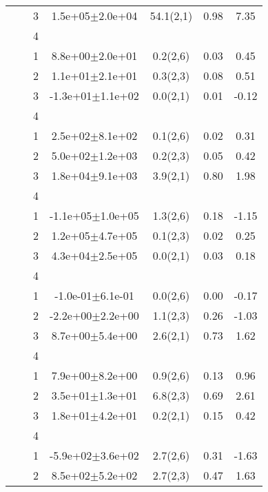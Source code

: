 \begin{longtable}{llccccS[table-format=-2.2, table-space-text-post = {***}]}
   &  & 3 &  1.5e+05$\pm$2.0e+04 & 54.1(2,1) & 0.98 & 7.35 \\ 
   &  & 4 &  &  &  &  \\ 
   \midrule
{} & {} & 1 &  8.8e+00$\pm$2.0e+01 & 0.2(2,6) & 0.03 & 0.45 \\ 
   &  & 2 &  1.1e+01$\pm$2.1e+01 & 0.3(2,3) & 0.08 & 0.51 \\ 
   &  & 3 & -1.3e+01$\pm$1.1e+02 & 0.0(2,1) & 0.01 & -0.12 \\ 
   &  & 4 &  &  &  &  \\ 
   \midrule
{} & {} & 1 &  2.5e+02$\pm$8.1e+02 & 0.1(2,6) & 0.02 & 0.31 \\ 
   &  & 2 &  5.0e+02$\pm$1.2e+03 & 0.2(2,3) & 0.05 & 0.42 \\ 
   &  & 3 &  1.8e+04$\pm$9.1e+03 & 3.9(2,1) & 0.80 & 1.98 \\ 
   &  & 4 &  &  &  &  \\ 
   \midrule
{} & {} & 1 & -1.1e+05$\pm$1.0e+05 & 1.3(2,6) & 0.18 & -1.15 \\ 
   &  & 2 &  1.2e+05$\pm$4.7e+05 & 0.1(2,3) & 0.02 & 0.25 \\ 
   &  & 3 &  4.3e+04$\pm$2.5e+05 & 0.0(2,1) & 0.03 & 0.18 \\ 
   &  & 4 &  &  &  &  \\ 
   \midrule
{} & {} & 1 & -1.0e-01$\pm$6.1e-01 & 0.0(2,6) & 0.00 & -0.17 \\ 
   &  & 2 & -2.2e+00$\pm$2.2e+00 & 1.1(2,3) & 0.26 & -1.03 \\ 
   &  & 3 &  8.7e+00$\pm$5.4e+00 & 2.6(2,1) & 0.73 & 1.62 \\ 
   &  & 4 &  &  &  &  \\ 
   \midrule
{} & {} & 1 &  7.9e+00$\pm$8.2e+00 & 0.9(2,6) & 0.13 & 0.96 \\ 
   &  & 2 &  3.5e+01$\pm$1.3e+01 & 6.8(2,3) & 0.69 & 2.61 \\ 
   &  & 3 &  1.8e+01$\pm$4.2e+01 & 0.2(2,1) & 0.15 & 0.42 \\ 
   &  & 4 &  &  &  &  \\ 
   \midrule
{} & {} & 1 & -5.9e+02$\pm$3.6e+02 & 2.7(2,6) & 0.31 & -1.63 \\ 
   &  & 2 &  8.5e+02$\pm$5.2e+02 & 2.7(2,3) & 0.47 & 1.63 \\ 

\end{longtable}
